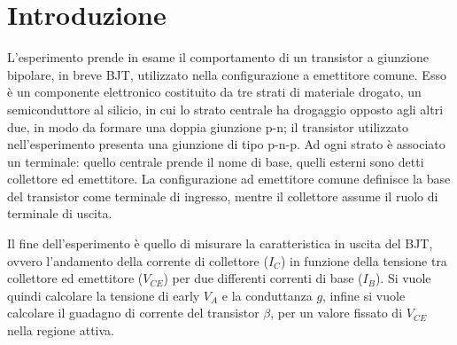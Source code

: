\documentclass[../main.tex]{subfiles}
\begin{document}
    \section{Introduzione} \label{sec:introduzione}


    L'esperimento prende in esame il comportamento di un transistor a giunzione bipolare,
    in breve BJT, utilizzato nella configurazione a emettitore comune. Esso è un componente
    elettronico costituito da tre strati di materiale drogato,
    un semiconduttore al silicio, in cui lo strato centrale ha drogaggio opposto agli
    altri due, in modo da formare una doppia giunzione p-n; il transistor
    utilizzato nell'esperimento presenta una giunzione di tipo p-n-p. Ad ogni strato è associato
    un terminale: quello centrale prende il nome di base,
    quelli esterni sono detti collettore ed emettitore. La configurazione ad emettitore
    comune definisce la base del transistor come terminale di ingresso, mentre il
    collettore assume il ruolo di terminale di uscita. \newline

    Il fine dell'esperimento è quello di misurare la caratteristica in uscita del BJT,
    ovvero l'andamento della corrente di collettore ($I_C$) in funzione della tensione
    tra collettore ed emettitore ($V_{CE}$) per due differenti correnti di base ($I_B$). Si vuole
    quindi calcolare la tensione di early $V_A$ e la conduttanza $g$, infine si
    vuole calcolare il guadagno di corrente del transistor $\beta$, per un valore fissato di $V_{CE}$
    nella regione attiva.

\end{document}
